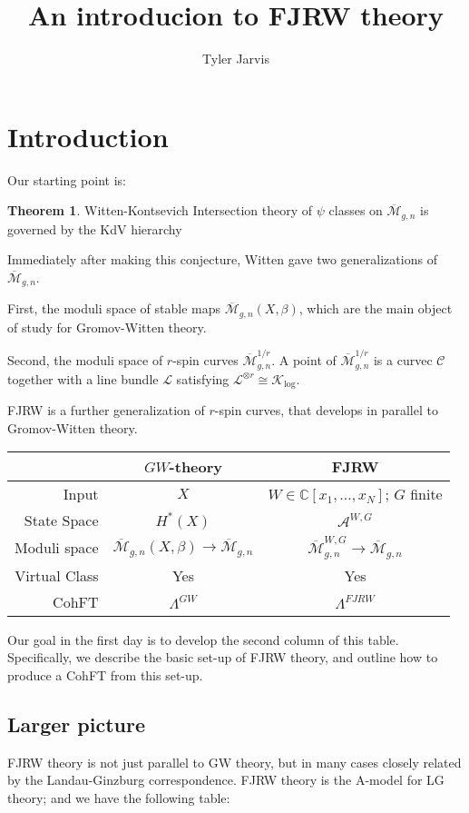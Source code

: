 \documentclass{amsart}
\title{An introducion to FJRW theory}
\author{Tyler Jarvis}
\theoremstyle{definition}
\newtheorem{theorem}[dummy]{Theorem}
\newcommand{\Mbar}{\overline{\mathcal{M}}}
\newcommand{\C}{\mathbb{C}}
\begin{document}
\maketitle

\section{Introduction}
Our starting point is:

\begin{theorem}{Witten-Kontsevich}
Intersection theory of $\psi$ classes on $\Mbar_{g,n}$ is governed by the KdV hierarchy
\end{theorem}

Immediately after making this conjecture, Witten gave two generalizations of $\Mbar_{g,n}$. 

First, the moduli space of stable maps $\Mbar_{g,n}(X,\beta)$, which are the main object of study for Gromov-Witten theory.

Second, the moduli space of $r$-spin curves $\Mbar^{1/r}_{g,n}$.  
A point of  $\Mbar^{1/r}_{g,n}$ is a curvec $\mathcal{C}$ together with a line bundle $\mathcal{L}$ satisfying $\mathcal{L}^{\otimes r}\cong \mathcal{K}_{\log}$.

FJRW is a further generalization of $r$-spin curves, that develops in parallel to Gromov-Witten theory.

\begin{center}
\begin{tabular}{rcc}
 & $GW$-theory & FJRW \\
\hline
Input & $X$ & $W\in \C[x_1,\dots, x_N]$; $G$ finite \\
State Space & $H^*(X)$ & $\mathcal{A}^{W,G}$ \\
Moduli space & $\Mbar_{g,n}(X,\beta)\to \Mbar_{g,n}$ & $\Mbar_{g,n}^{W,G}\to\Mbar_{g,n}$ \\
Virtual Class & Yes & Yes \\
CohFT & $\Lambda^{GW}$ & $\Lambda^{FJRW}$
\end{tabular}
\end{center}

Our goal in the first day is to develop the second column of this table.  
Specifically, we describe the basic set-up of FJRW theory, and outline how to produce a CohFT from this set-up.

\subsection{Larger picture}
FJRW theory is not just parallel to GW theory, but in many cases closely related by the Landau-Ginzburg correspondence.  
FJRW theory is the A-model for LG theory; and we have the following table:
\end{document}
